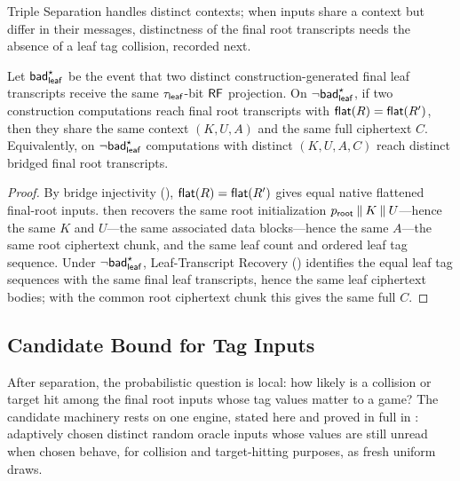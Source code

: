 Triple Separation handles distinct contexts; when inputs share a context
but differ in their messages, distinctness of the final root transcripts
needs the absence of a leaf tag collision, recorded next.

\begin{proposition}
\label{prop:final-root-sep}
Let $\mathsf{bad}_{\mathsf{leaf}}^\star$ be the event that two distinct construction-generated
final leaf transcripts receive the same $\tau_{\mathsf{leaf}}$-bit $\mathsf{RF}$ projection.
On $\neg\mathsf{bad}_{\mathsf{leaf}}^\star$, if two \TW{} construction computations reach
final root transcripts with $\mathsf{flat}(R) = \mathsf{flat}(R')$, then they share
the same context $(K, U, A)$ and the same full ciphertext $C$.
Equivalently, on $\neg\mathsf{bad}_{\mathsf{leaf}}^\star$ computations with distinct
$(K, U, A, C)$ reach distinct bridged final root transcripts.
\end{proposition}

\begin{proof}
By bridge injectivity (),
$\mathsf{flat}(R) = \mathsf{flat}(R')$ gives equal native flattened final-root
inputs.  then recovers the same root
initialization $p_{\mathsf{root}} \mathbin{\|} K \mathbin{\|} U$---hence the same $K$ and
$U$---the same associated data blocks---hence the same $A$---the same root
ciphertext chunk, and the same leaf count and ordered leaf tag sequence.
Under $\neg\mathsf{bad}_{\mathsf{leaf}}^\star$, Leaf-Transcript Recovery
() identifies the equal leaf tag sequences with
the same final leaf transcripts, hence the same leaf ciphertext bodies;
with the common root ciphertext chunk this gives the same full $C$.
\end{proof}

\subsection{Candidate Bound for Tag Inputs}

After separation, the probabilistic question is local: how likely is a collision
or target hit among the final root inputs whose tag values matter to a game?
The candidate machinery rests on one engine, stated here and proved in full in
: adaptively chosen distinct random oracle
inputs whose values are still unread when chosen behave, for collision and
target-hitting purposes, as fresh uniform draws.

